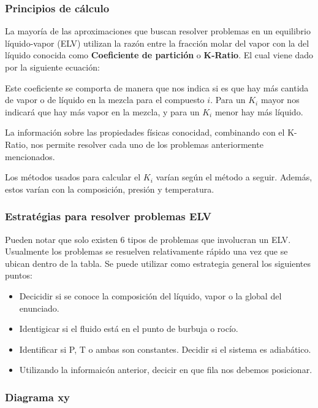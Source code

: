 \subsubsection{Principios de cálculo}

La mayoría de las aproximaciones que buscan resolver problemas en un equilibrio líquido-vapor (ELV) utilizan la razón entre la fracción molar del vapor con la del líquido
conocida como \textbf{Coeficiente de partición} o \textbf{K-Ratio}. El cual viene dado por la siguiente ecuación:


Este coeficiente se comporta de manera que nos indica si es que hay más cantida de vapor o de líquido en la mezcla para el compuesto $i$. 
Para un $K_i$ mayor nos indicará que hay más vapor en la mezcla, y para un $K_i$ menor hay más líquido.

La información sobre las propiedades físicas conocidad, combinando con el K-Ratio, nos permite resolver cada uno de los problemas anteriormente mencionados.

Los métodos usados para calcular el $K_i$ varían según el método a seguir. Además, estos varían con la composición, presión y temperatura.

\subsubsection{Estratégias para resolver problemas ELV}

Pueden notar que solo existen 6 tipos de problemas que involucran un ELV. Usualmente los problemas se resuelven relativamente rápido una vez
que se ubican dentro de la tabla. Se puede utilizar como estrategia general los siguientes puntos:

\begin{itemize}
    \item Decicidir si se conoce la composición del líquido, vapor o la global del enunciado.
    \item Identigicar si el fluido está en el punto de burbuja o rocío.
    \item Identificar si P, T o ambas son constantes. Decidir si el sistema es adiabático.
    \item Utilizando la informaicón anterior, decicir en que fila nos debemos posicionar.
\end{itemize}

\subsubsection{Diagrama xy}

